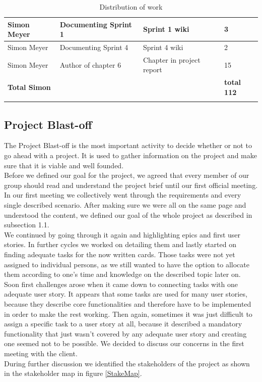 \begin{longtable}{|p{}||p{}|p{}|p{}|}
    \hline
    Simon Meyer& Documenting Sprint 1 & Sprint 1 wiki & 3 \\ 
    \hline 
    Simon Meyer& Documenting Sprint 4 & Sprint 4 wiki & 2 \\ 
    \hline 
    Simon Meyer& Author of chapter 6 & Chapter in project report & 15 \\ 
    \hline
    \hline 
    \textbf{Total \newline Simon} & & & \textbf{total 112}   \\
    \hline
    \hline
  \caption{Distribution of work}
\end{longtable}


\subsection{Project Blast-off}

The Project Blast-off is the most important activity to decide whether or not to go ahead with a project. It is used to gather information on the project and make sure that it is viable and well founded. \\ 
Before we defined our goal for the project, we agreed that every member of our group should read and understand the project brief until our first official meeting. In our first meeting we collectively went through the requirements and every single described scenario. After making sure we were all on the same page and understood the content, we defined our goal of the whole project as described in subsection 1.1. \\ 
We continued by going through it again and highlighting epics and first user stories. In further cycles we worked on detailing them and lastly started on finding adequate tasks for the now written cards. Those tasks were not yet assigned to individual persons, as we still wanted to have the option to allocate them according to one’s time and knowledge on the described topic later on. Soon first challenges arose when it came down to connecting tasks with one adequate user story. It appears that some tasks are used for many user stories, because they describe core functionalities and therefore have to be implemented in order to make the rest working. Then again, sometimes it was just difficult to assign a specific task to a user story at all, because it described a mandatory functionality that just wasn’t covered by any adequate user story and creating one seemed not to be possible. We decided to discuss our concerns in the first meeting with the client.\\ 
During further discussion we identified the stakeholders of the project as shown in the stakeholder map in figure \ref{StakeMap}. \\ 

